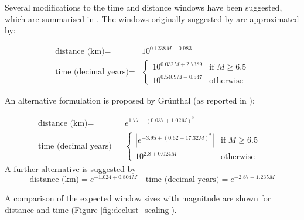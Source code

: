 Several modifications to the time and distance windows have been 
suggested, which are summarised in \textcite{vanStiphout2012}. The windows 
originally suggested by \textcite{GardnerKnopoff1974} are approximated by:

\begin{equation}\begin{split} 
\mbox{distance (km)} = &10^{0.1238 M + 0.983}\\
\mbox{time (decimal years)} = & 
\begin{cases} 10^{0.032 M + 2.7389} & \text{if $M \geq 6.5$} \\ 
              10^{0.5409 M - 0.547} & \mbox{otherwise}  \end{cases}\end{split}
\end{equation}

An alternative formulation is proposed by Gr\"unthal (as reported in \textcite{vanStiphout2012}):

\begin{equation}\begin{split} 
\mbox{distance (km)} = & e^{1.77 + \left( {0.037 + 1.02 M} \right)^2} \\ 
   \mbox{time (decimal years)} = & \begin{cases}   |e^{-3.95+ \left( {0.62 + 17.32 M}
    \right)^2}|    & \text{if $M \geq 6.5$ } \\ 10^{2.8 + 0.024 M} & 
    \text{otherwise}  \end{cases}\end{split}
\end{equation}
A further alternative is suggested by \textcite{Uhrhammer1986}
%
\begin{equation}
\mbox{distance (km)} = e^{-1.024 + 0.804 M} \quad \mbox{time (decimal years)} = 
    e^{-2.87 + 1.235 M}
\end{equation}

A comparison of the expected window sizes with magnitude are shown for 
distance  and time (Figure \ref{fig:declust_scaling}).

